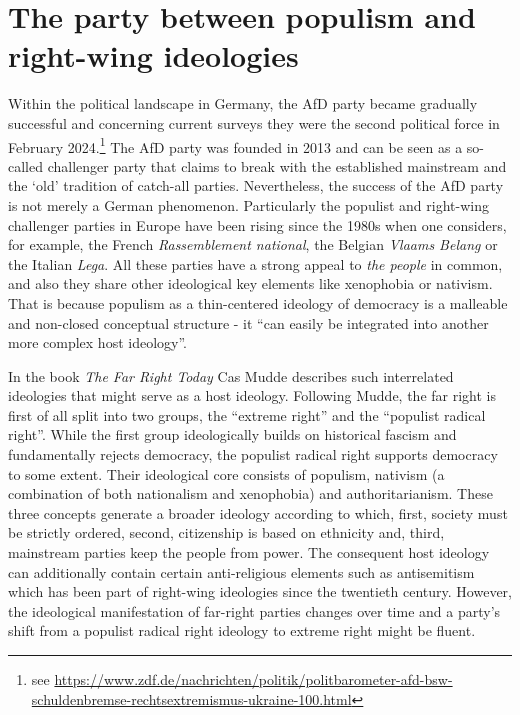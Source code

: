 \documentclass[a4paper]{scrreprt}
\begin{document}
\section{The party between populism and right-wing ideologies}
Within the political landscape in Germany, the AfD party became gradually successful and concerning current surveys they were the second political force in February 2024.\footnote{see \url{https://www.zdf.de/nachrichten/politik/politbarometer-afd-bsw-schuldenbremse-rechtsextremismus-ukraine-100.html}} The AfD party was founded in 2013 and can be seen as a so-called challenger party that claims to break with the established mainstream and the `old' tradition of catch-all parties. \citep{devries:2020} Nevertheless, the success of the AfD party is not merely a German phenomenon. Particularly the populist and right-wing challenger parties in Europe have been rising since the 1980s when one considers, for example, the French {\em Rassemblement national}, the Belgian {\em Vlaams Belang} or the Italian {\em Lega}. \cite[p.~30]{devries:2020} All these parties have a strong appeal to {\em the people} in common, and also they share other ideological key elements like xenophobia or nativism. That is because populism as a thin-centered ideology of democracy is a malleable and non-closed conceptual structure - it ``can easily be integrated into another more complex host ideology''. \cite[p.~19]{devries:2020}\par
In the book {\em The Far Right Today} Cas Mudde describes such interrelated ideologies that might serve as a host ideology. Following Mudde, the far right is first of all split into two groups, the ``extreme right'' and the ``populist radical right''. While the first group ideologically builds on historical fascism and fundamentally rejects democracy, the populist radical right supports democracy to some extent. Their ideological core consists of populism, nativism (a combination of both nationalism and xenophobia) and authoritarianism. \cite[p.~24]{mudde:2019} These three concepts generate a broader ideology according to which, first, society must be strictly ordered, second, citizenship is based on ethnicity and, third, mainstream parties keep the people from power. The consequent host ideology can additionally contain certain anti-religious elements such as antisemitism which has been part of right-wing ideologies since the twentieth century. \cite[p.~28]{mudde:2019} However, the ideological manifestation of far-right parties changes over time and a party's shift from a populist radical right ideology to extreme right might be fluent.\par
\end{document}
